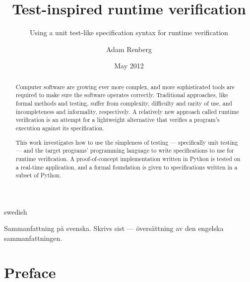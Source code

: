 \documentclass[a4paper,11pt]{kth-mag}
\title{Test-inspired runtime verification}
\subtitle{Using a unit test-like specification syntax for runtime verification}
\author{Adam Renberg}
\date{May 2012}
\begin{document}

\frontmatter
\pagestyle{empty}
\removepagenumbers
\maketitle
{}





\begin{abstract}

Computer software are growing ever more complex, and more sophisticated tools
are required to make sure the software operates correctly. Traditional
approaches, like formal methods and testing, suffer from complexity, difficulty
and rarity of use, and incompleteness and informality, respectively. A
relatively new approach called runtime verification is an attempt for a
lightweight alternative that verifies a program's execution against its
specification.

This work investigates how to use the simpleness of testing --- specifically
unit testing --- and the target programs' programming language to write
specifications to use for runtime verification. A proof-of-concept
implementation written in Python is tested on a real-time application, and a
formal foundation is given to specifications written in a subset of Python.

\end{abstract}
\clearpage


\begin{foreignabstract}{swedish}

Sammanfattning på svenska. Skrivs sist --- översättning av den engelska
sammanfattningen.

\end{foreignabstract}
\clearpage





\pagestyle{newchap}
\chapter*{Preface}
\end{document}
